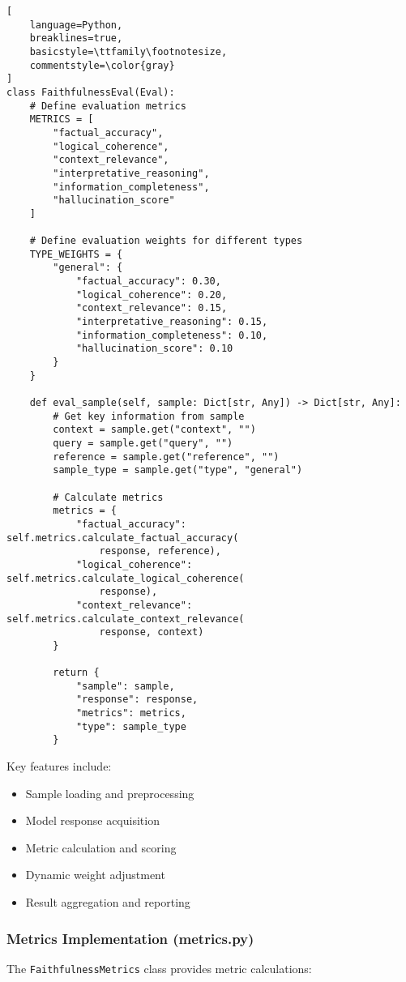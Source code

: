 \begin{lstlisting}[
    language=Python,
    breaklines=true,
    basicstyle=\ttfamily\footnotesize,
    commentstyle=\color{gray}
]
class FaithfulnessEval(Eval):
    # Define evaluation metrics
    METRICS = [
        "factual_accuracy",
        "logical_coherence",
        "context_relevance",
        "interpretative_reasoning",
        "information_completeness",
        "hallucination_score"
    ]
    
    # Define evaluation weights for different types
    TYPE_WEIGHTS = {
        "general": {
            "factual_accuracy": 0.30,
            "logical_coherence": 0.20,
            "context_relevance": 0.15,
            "interpretative_reasoning": 0.15,
            "information_completeness": 0.10,
            "hallucination_score": 0.10
        }
    }
    
    def eval_sample(self, sample: Dict[str, Any]) -> Dict[str, Any]:
        # Get key information from sample
        context = sample.get("context", "")
        query = sample.get("query", "")
        reference = sample.get("reference", "")
        sample_type = sample.get("type", "general")
        
        # Calculate metrics
        metrics = {
            "factual_accuracy": self.metrics.calculate_factual_accuracy(
                response, reference),
            "logical_coherence": self.metrics.calculate_logical_coherence(
                response),
            "context_relevance": self.metrics.calculate_context_relevance(
                response, context)
        }
        
        return {
            "sample": sample,
            "response": response,
            "metrics": metrics,
            "type": sample_type
        }
\end{lstlisting}

\vspace{0.5em}
Key features include:
\begin{itemize}
    \item Sample loading and preprocessing
    \item Model response acquisition
    \item Metric calculation and scoring
    \item Dynamic weight adjustment
    \item Result aggregation and reporting
\end{itemize}

\subsubsection{Metrics Implementation (metrics.py)}
The \texttt{FaithfulnessMetrics} class provides metric calculations:

